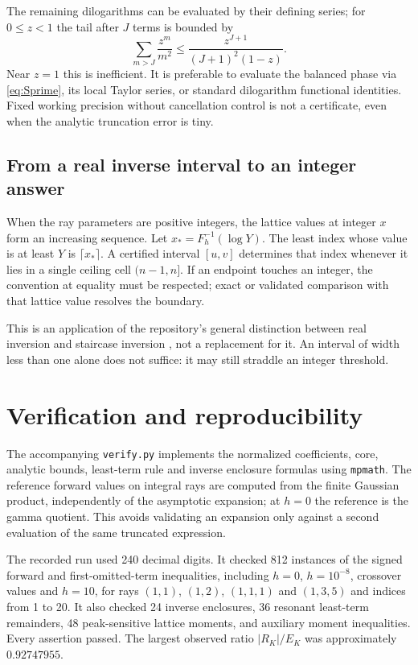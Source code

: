 \documentclass[11pt,a4paper]{article}
\numberwithin{equation}{section}
\theoremstyle{definition}\newtheorem{definition}[theorem]{Definition}
\theoremstyle{remark}\newtheorem{remark}[theorem]{Remark}
\begin{document}
The remaining dilogarithms can be evaluated by their defining series; for
$0\le z<1$ the tail after $J$ terms is bounded by
\begin{equation}
 \sum_{m>J}\frac{z^m}{m^2}\le
           \frac{z^{J+1}}{(J+1)^2(1-z)}.
\end{equation}
Near $z=1$ this is inefficient. It is preferable to evaluate the balanced phase
via \eqref{eq:Sprime}, its local Taylor series, or standard dilogarithm
functional identities. Fixed working precision without cancellation control
is not a certificate, even when the analytic truncation error is tiny.

\subsection{From a real inverse interval to an integer answer}
When the ray parameters are positive integers, the lattice values at integer
$x$ form an increasing sequence. Let $x_*=F_h^{-1}(\log Y)$. The least index
whose value is at least $Y$ is $\lceil x_*\rceil$. A certified interval
$[u,v]$ determines that index whenever it lies in a single ceiling cell
$(n-1,n]$. If an endpoint touches an integer, the convention at equality must
be respected; exact or validated comparison with that lattice value resolves
the boundary.

This is an application of the repository's general distinction between real
inversion and staircase inversion \cite{repo-readme}, not a replacement for
it. An interval of width less than one alone does not suffice: it may still
straddle an integer threshold.

\section{Verification and reproducibility}
\label{sec:verification}

The accompanying \texttt{verify.py} implements the normalized coefficients,
core, analytic bounds, least-term rule and inverse enclosure formulas using
\texttt{mpmath}. The reference forward values on integral rays are computed
from the finite Gaussian product, independently of the asymptotic expansion;
at $h=0$ the reference is the gamma quotient. This avoids validating an
expansion only against a second evaluation of the same truncated expression.

The recorded run used 240 decimal digits. It checked 812 instances of the
signed forward and first-omitted-term inequalities, including $h=0$,
$h=10^{-8}$, crossover values and $h=10$, for rays $(1,1)$, $(1,2)$,
$(1,1,1)$ and $(1,3,5)$ and indices from 1 to 20. It also checked 24 inverse
enclosures, 36 resonant least-term remainders, 48 peak-sensitive lattice
moments, and auxiliary moment inequalities. Every assertion passed. The
largest observed ratio $|R_K|/E_K$ was approximately $0.92747955$.
\end{document}
